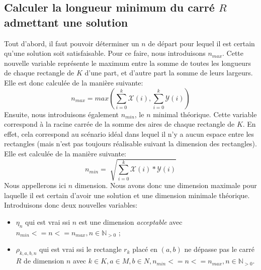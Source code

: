 \documentclass[a4paper]{article}
\begin{document}
\subsection{Calculer la longueur minimum du carré $R$ admettant une solution}
Tout d'abord, il faut pouvoir déterminer un $n$ de départ pour lequel il est certain qu'une solution soit satisfaisable. Pour ce faire, nous introduisons $n_{max}$. Cette nouvelle variable représente le maximum entre la somme de toutes les longueurs de chaque rectangle de $K$ d'une part, et d'autre part la somme de leurs largeurs. Elle est donc calculée de la manière suivante:
\begin{equation*}
n_{max} = max ( \sum_{i=0}^k \mathcal{X}(i) , \sum_{i=0}^k \mathcal{Y}(i) )
\end{equation*}
Ensuite, nous introduisons également $n_{min}$, le $n$ minimal théorique. Cette variable correspond à la racine carrée de la somme des aires de chaque rectangle de $K$. En effet, cela correspond au scénario idéal dans lequel il n'y a aucun espace entre les rectangles (mais n'est pas toujours réalisable suivant la dimension des rectangles). Elle est calculée de la manière suivante:
\begin{equation*}
n_{min} = \sqrt[]{ \sum_{i=0}^k \mathcal{X}(i) * \mathcal{Y}(i) }
\end{equation*}
Nous appellerons ici $n$ dimension. Nous avons donc une dimension maximale pour laquelle il est certain d'avoir une solution et une dimension minimale théorique. 
Introduisons donc deux nouvelles variables:
\begin{itemize}
\item $\eta_{n}$ qui est vrai ssi $n$ est une dimension \textit{acceptable} avec $n_{min} <= n <= n_{max}, n \in \mathbb{N}_{>0}$ ;
\item $\rho_{k,a,b,n}$ qui est vrai ssi le rectangle $r_k$ placé en $(a,b)$ ne dépasse pas le carré $R$ de dimension $n$  avec $k \in K, a \in M, b \in N, n_{min} <= n <= n_{max}, n \in \mathbb{N}_{>0}$.\\
\end{itemize}
\end{document}
